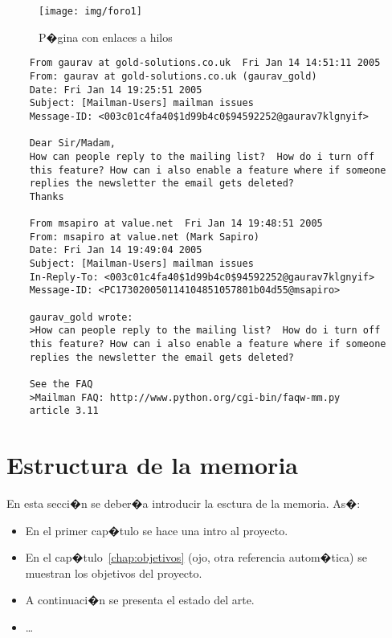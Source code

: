 \documentclass[a4paper, 12pt]{book}
\begin{document}
 \begin{figure}
    \centering
    \texttt{[image: img/foro1]}
    \caption{P�gina con enlaces a hilos}
    \label{figura:foro_hilos}
 \end{figure}

{\footnotesize
\begin{verbatim}
    From gaurav at gold-solutions.co.uk  Fri Jan 14 14:51:11 2005
    From: gaurav at gold-solutions.co.uk (gaurav_gold)
    Date: Fri Jan 14 19:25:51 2005
    Subject: [Mailman-Users] mailman issues
    Message-ID: <003c01c4fa40$1d99b4c0$94592252@gaurav7klgnyif>

    Dear Sir/Madam,
    How can people reply to the mailing list?  How do i turn off
    this feature? How can i also enable a feature where if someone
    replies the newsletter the email gets deleted?
    Thanks

    From msapiro at value.net  Fri Jan 14 19:48:51 2005
    From: msapiro at value.net (Mark Sapiro)
    Date: Fri Jan 14 19:49:04 2005
    Subject: [Mailman-Users] mailman issues
    In-Reply-To: <003c01c4fa40$1d99b4c0$94592252@gaurav7klgnyif>
    Message-ID: <PC173020050114104851057801b04d55@msapiro>

    gaurav_gold wrote:
    >How can people reply to the mailing list?  How do i turn off
    this feature? How can i also enable a feature where if someone
    replies the newsletter the email gets deleted?

    See the FAQ
    >Mailman FAQ: http://www.python.org/cgi-bin/faqw-mm.py
    article 3.11
\end{verbatim}
}

\section{Estructura de la memoria}
\label{sec:estructura}

En esta secci�n se deber�a introducir la esctura de la memoria. As�:

\begin{itemize}
  \item En el primer cap�tulo se hace una intro al proyecto.

  \item En el cap�tulo~\ref{chap:objetivos} (ojo, otra referencia autom�tica) se muestran los objetivos del proyecto.

  \item A continuaci�n se presenta el estado del arte.

  \item \ldots
\end{itemize}
\end{document}
